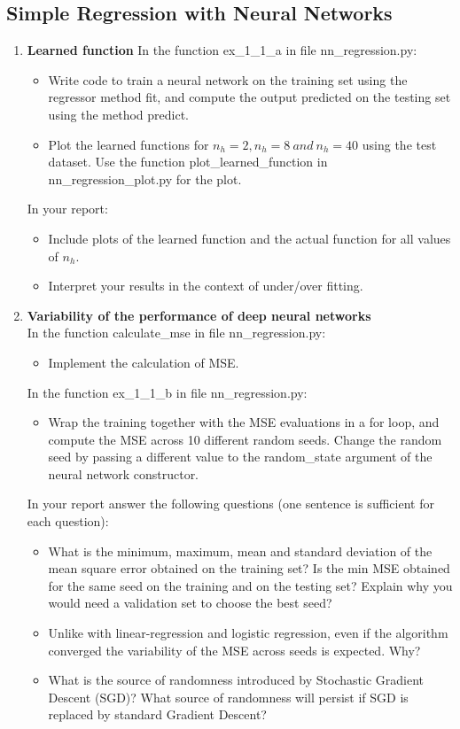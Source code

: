 \documentclass[a4paper]{article}
\begin{document}
\subsection{Simple Regression with Neural Networks}
\begin{enumerate}[label=(\alph*)]
\item \textbf{Learned function}
    In the function ex\_1\_1\_a in file nn\_regression.py:
    \begin{itemize}
        \item Write code to train a neural network on the training set using the regressor method fit, and compute the output predicted on the testing set using the method predict.
        \item Plot the learned functions for $n_h = 2, n_h = 8 ~and ~n_h = 40$ using the test dataset. Use the function plot\_learned\_function in nn\_regression\_plot.py for the plot.
    \end{itemize}
    In your report:    
    \begin{itemize}
        \item Include plots of the learned function and the actual function for all values of $n_h$.
        \item Interpret your results in the context of under/over fitting.
	\end{itemize}
    
\item \textbf{Variability of the performance of deep neural networks}\\
	In the function calculate\_mse in file nn\_regression.py:
    \begin{itemize}
    	\item Implement the calculation of MSE.
    \end{itemize}
    In the function ex\_1\_1\_b in file nn\_regression.py:
    \begin{itemize}
    	\item Wrap the training together with the MSE evaluations in a for loop, and compute the MSE across 10 different random seeds. Change the random seed by passing a different value to the random\_state argument of the neural network constructor.
    \end{itemize}
	In your report answer the following questions (one sentence is sufficient for each question):
    \begin{itemize}
    	\item What is the minimum, maximum, mean and standard deviation of the mean square error obtained on the training set? Is the min MSE obtained for the same seed on the training and on the testing set? Explain why you would need a validation set to choose the best seed?
    	\item Unlike with linear-regression and logistic regression, even if the algorithm converged the variability of the MSE across seeds is expected. Why?
        \item What is the source of randomness introduced by Stochastic Gradient Descent (SGD)? What source of randomness will persist if SGD is replaced by standard Gradient Descent?
    \end{itemize}
    

\end{enumerate}
\end{document}
